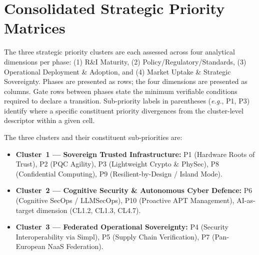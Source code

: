 \documentclass[10pt,a4paper]{article}
\begin{document}

\section{Consolidated Strategic Priority Matrices}

The three strategic priority clusters are each assessed across four analytical
dimensions per phase: (1) R\&I Maturity, (2) Policy/Regulatory/Standards,
(3) Operational Deployment \& Adoption, and (4) Market Uptake \& Strategic
Sovereignty. Phases are presented as rows; the four dimensions are presented
as columns. Gate rows between phases state the minimum verifiable conditions
required to declare a transition. Sub-priority labels in parentheses
(\textit{e.g.}, P1, P3) identify where a specific constituent priority
divergences from the cluster-level descriptor within a given cell.

\bigskip
\noindent The three clusters and their constituent sub-priorities are:
\begin{itemize}[noitemsep]
  \item \textbf{Cluster~1 --- Sovereign Trusted Infrastructure:}
        P1 (Hardware Roots of Trust), P2 (PQC Agility),
        P3 (Lightweight Crypto \& PhySec), P8 (Confidential Computing),
        P9 (Resilient-by-Design / Island Mode).
  \item \textbf{Cluster~2 --- Cognitive Security \& Autonomous Cyber Defence:}
        P6 (Cognitive SecOps / LLMSecOps), P10 (Proactive APT Management),
        AI-as-target dimension (CL1.2, CL1.3, CL4.7).
  \item \textbf{Cluster~3 --- Federated Operational Sovereignty:}
        P4 (Security Interoperability via Simpl),
        P5 (Supply Chain Verification),
        P7 (Pan-European NaaS Federation).
\end{itemize}

\newpage

\newpage



\newpage


%
%
\end{document}
